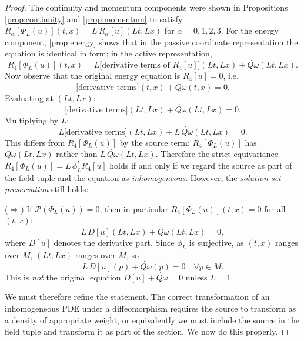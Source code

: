 \documentclass[10pt,a4paper]{amsart}
\newcommand{\Qdot}{\dot{Q\omega}}
\begin{document}
\begin{proof}
The continuity and momentum components were shown in
Propositions \ref{prop:continuity} and \ref{prop:momentum} to satisfy
$R_\alpha[\Phi_L(u)](t,x)=L\,R_\alpha[u](Lt,Lx)$ for
$\alpha=0,1,2,3$.  For the energy component, \ref{prop:energy} shows that in
the passive coordinate representation the equation is identical in form; in
the active representation,
\[
R_4[\Phi_L(u)](t,x)
=L\bigl[\text{derivative terms of }R_4[u]\bigr](Lt,Lx)+\Qdot(Lt,Lx).
\]
Now observe that the original energy equation is $R_4[u]=0$, i.e.
\[
\bigl[\text{derivative terms}\bigr](t,x)+\Qdot(t,x)=0.
\]
Evaluating at $(Lt,Lx)$:
\[
\bigl[\text{derivative terms}\bigr](Lt,Lx)+\Qdot(Lt,Lx)=0.
\]
Multiplying by $L$:
\[
L\bigl[\text{derivative terms}\bigr](Lt,Lx)+L\,\Qdot(Lt,Lx)=0.
\]
This differs from $R_4[\Phi_L(u)]$ by the source term: $R_4[\Phi_L(u)]$ has
$\Qdot(Lt,Lx)$ rather than $L\,\Qdot(Lt,Lx)$.  Therefore the strict
equivariance $R_4[\Phi_L(u)]=L\,\phi_L^*R_4[u]$ holds if and only if we
regard the source as part of the field tuple and the equation as
\emph{inhomogeneous}.  However, the \emph{solution-set preservation} still
holds:

($\Rightarrow$) If $\mathcal P(\Phi_L(u))=0$, then in particular
$R_4[\Phi_L(u)](t,x)=0$ for all $(t,x)$:
\[
L\,D[u](Lt,Lx)+\Qdot(Lt,Lx)=0,
\]
where $D[u]$ denotes the derivative part.  Since $\phi_L$ is surjective, as
$(t,x)$ ranges over $M$, $(Lt,Lx)$ ranges over $M$, so
\[
L\,D[u](p)+\Qdot(p)=0\quad\forall p\in M.
\]
This is \emph{not} the original equation $D[u]+\Qdot=0$ unless $L=1$.

We must therefore refine the statement.  The correct transformation of an
inhomogeneous PDE under a diffeomorphism requires the source to transform as
a density of appropriate weight, or equivalently we must include the source
in the field tuple and transform it as part of the section.  We now do this
properly.
\end{proof}
\end{document}
